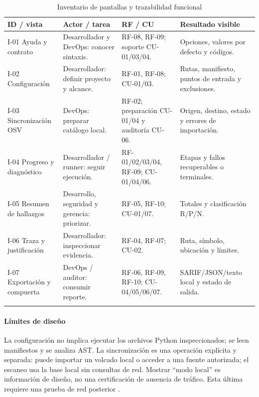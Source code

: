 \begin{table}[H]
\centering\small{}
\caption{Inventario de pantallas y trazabilidad funcional}
\begin{tabularx}{\textwidth}{P{3cm}YYY}
\toprule
\textbf{ID / vista} & \textbf{Actor / tarea} & \textbf{RF / CU} & \textbf{Resultado visible} \\
\midrule
I-01 Ayuda y contrato & Desarrollador y DevOps: conocer sintaxis. & RF-08, RF-09; soporte CU-01/03/04. & Opciones, valores por defecto y códigos. \\
\addlinespace
I-02 Configuración & Desarrollador: definir proyecto y alcance. & RF-01, RF-08; CU-01/03. & Rutas, manifiesto, puntos de entrada y exclusiones. \\
\addlinespace
I-03 Sincronización OSV & DevOps: preparar catálogo local. & RF-02; preparación CU-01/04 y auditoría CU-06. & Origen, destino, estado y errores de importación. \\
\addlinespace
I-04 Progreso y diagnóstico & Desarrollador / runner: seguir ejecución. & RF-01/02/03/04, RF-09; CU-01/04/06. & Etapas y fallos recuperables o terminales. \\
\addlinespace
I-05 Resumen de hallazgos & Desarrollo, seguridad y gerencia: priorizar. & RF-05, RF-10; CU-01/07. & Totales y clasificación R/P/N. \\
\addlinespace
I-06 Traza y justificación & Desarrollador: inspeccionar evidencia. & RF-04, RF-07; CU-02. & Ruta, símbolo, ubicación y límites. \\
\addlinespace
I-07 Exportación y compuerta & DevOps / auditor: consumir reporte. & RF-06, RF-09, RF-10; CU-04/05/06/07. & SARIF/JSON/texto local y estado de salida. \\
\addlinespace
\bottomrule
\end{tabularx}
\end{table}


\paragraph*{Límites de diseño}
La configuración no implica ejecutar los archivos Python inspeccionados; se leen manifiestos y se analiza AST. La sincronización es una operación explícita y separada: puede importar un volcado local o acceder a una fuente autorizada; el escaneo usa la base local sin consultas de red. Mostrar ``modo local'' es información de diseño, no una certificación de ausencia de tráfico. Esta última requiere una prueba de red posterior \parencite{ladisa2023sok,openssf2023osv}.

